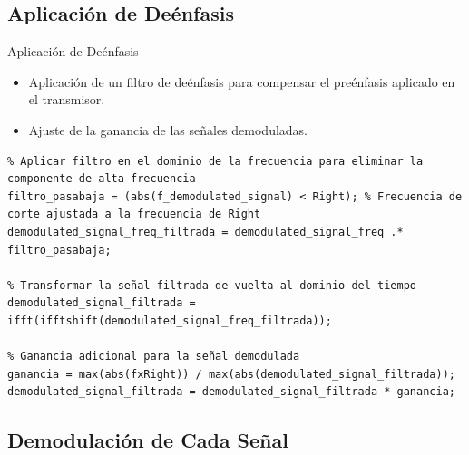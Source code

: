 \documentclass[mathserif,spanish]{beamer}
\begin{document}
\subsection{Aplicación de Deénfasis}
\begin{frame}{Aplicación de Deénfasis}
    \begin{itemize}
        \item Aplicación de un filtro de deénfasis para compensar el preénfasis aplicado en el transmisor.
        \item Ajuste de la ganancia de las señales demoduladas.
    \end{itemize}
    \begin{tcolorbox}[colback=yellow!5!white, colframe=yellow!75!black, title=Aplicación de Deénfasis y Ajuste de Ganancia, fonttitle=\normalsize, fontupper=\normalsize]
\begin{lstlisting}
% Aplicar filtro en el dominio de la frecuencia para eliminar la componente de alta frecuencia
filtro_pasabaja = (abs(f_demodulated_signal) < Right); % Frecuencia de corte ajustada a la frecuencia de Right
demodulated_signal_freq_filtrada = demodulated_signal_freq .* filtro_pasabaja;

% Transformar la señal filtrada de vuelta al dominio del tiempo
demodulated_signal_filtrada = ifft(ifftshift(demodulated_signal_freq_filtrada));

% Ganancia adicional para la señal demodulada
ganancia = max(abs(fxRight)) / max(abs(demodulated_signal_filtrada));
demodulated_signal_filtrada = demodulated_signal_filtrada * ganancia;
\end{lstlisting}
    \end{tcolorbox}
\end{frame}


\subsection{Demodulación de Cada Señal}
\end{document}
